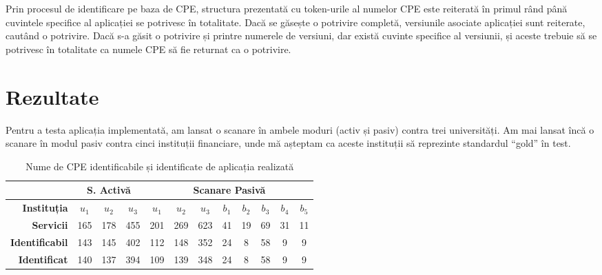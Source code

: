 	Prin procesul de identificare pe baza de CPE, structura prezentată cu token-urile al numelor CPE este reiterată în primul rând până cuvintele specifice al aplicației se potrivesc în totalitate. Dacă se găsește o potrivire completă, versiunile asociate aplicației sunt reiterate, cautând o potrivire. Dacă s-a găsit o potrivire și printre numerele de versiuni, dar există cuvinte specifice al versiunii, și aceste trebuie să se potrivesc în totalitate ca numele CPE să fie returnat ca o potrivire.

\section*{Rezultate}

	Pentru a testa aplicația implementată, am lansat o scanare în ambele moduri (activ și pasiv) contra trei universități. Am mai lansat încă o scanare în modul pasiv contra cinci instituții financiare, unde mă așteptam ca aceste instituții să reprezinte standardul ``gold'' în test.

	\begin{table}[H]
		\centering
		\begin{tabular}{r|ccc|ccc|ccccc|}
			\cline{2-12}
			\multicolumn{1}{l|}{}                         & \multicolumn{3}{c|}{\textbf{S. Activă}} & \multicolumn{8}{c|}{\textbf{Scanare Pasivă}}                                                             \\ \hline
			\multicolumn{1}{|r|}{\textbf{Instituția}}      & \textbf{$u_1$}    & \textbf{$u_2$}    & \textbf{$u_3$}   & \textbf{$u_1$} & \textbf{$u_2$} & \textbf{$u_3$} & \textbf{$b_1$} & \textbf{$b_2$} & \textbf{$b_3$} & \textbf{$b_4$} & \textbf{$b_5$} \\ \hline
			\multicolumn{1}{|r|}{\textbf{Servicii}} & 165            & 178            & 455           & 201         & 269         & 623         & 41          & 19          & 69          & 31          & 11          \\
			\multicolumn{1}{|r|}{\textbf{Identificabil}} & 143            & 145            & 402           & 112         & 148         & 352         & 24          & 8           & 58          & 9           & 9           \\
			\multicolumn{1}{|r|}{\textbf{Identificat}}   & 140            & 137            & 394           & 109         & 139         & 348         & 24          & 8           & 58          & 9           & 9           \\ \hline
		\end{tabular}
		\caption{Nume de CPE identificabile și identificate de aplicația realizată}
		\label{cpeids_ro}
	\end{table}
	
